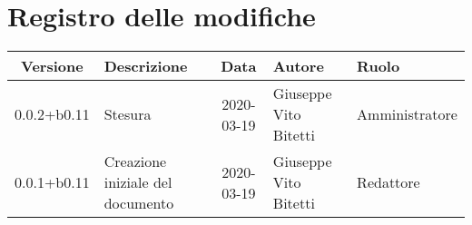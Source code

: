 \section*{Registro delle modifiche}

\begin{center}
	\begin{longtable}{|c|p{3.5cm}|c|p{3cm}|p{3cm}|}
	\hline
	\rowcolor{lighter-grayer}
	\textbf{Versione} & \textbf{Descrizione} & \textbf{Data} & \textbf{Autore} & \textbf{Ruolo} \\
	\hline
	\endfirsthead

	0.0.2+b0.11 & Stesura & 2020-03-19 & Giuseppe Vito Bitetti & Amministratore \\
	\hline
	0.0.1+b0.11 & Creazione iniziale del documento & 2020-03-19 & Giuseppe Vito Bitetti & Redattore \\
	\hline

	\end{longtable}
\end{center}
